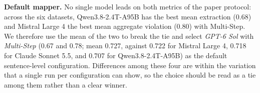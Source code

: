 \smallskip\noindent\textbf{Default mapper.}
No single model leads on both metrics of the paper protocol: across the six
datasets, Qwen3.8-2.4T-A95B has the best mean extraction (0.68) and Mistral
Large 4 the best mean aggregate violation (0.80) with Multi-Step. We therefore use the mean of the two to break the tie and select
\emph{GPT-6 Sol} with \emph{Multi-Step} (0.67 and 0.78; mean 0.727, against 0.722 for
Mistral Large 4, 0.718 for Claude Sonnet 5.5, and 0.707 for Qwen3.8-2.4T-A95B) as the default
sentence-level configuration. Differences among these four are within the variation that a single
run per configuration can show, so the choice should be read as a tie among
them rather than a clear winner.
